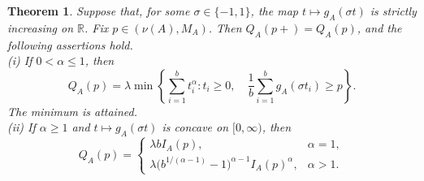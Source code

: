\documentclass[a4paper, 11pt]{article}
\newcommand{\1}{\mathbf 1}
\theoremstyle{plain}
\newtheorem{theorem}{Theorem}[section]
\begin{document}
\begin{theorem}\label{thm:dimension-reduction}
Suppose that, for some \(\sigma\in\{-1,1\}\), the map
\(t\mapsto g_A(\sigma t)\) is strictly increasing on
 \(\mathbb{R}\). Fix $p\in(\nu(A),M_A)$. Then \(Q_A(p+)=Q_A(p)\), and the following assertions hold.\\
(i) If \(0<\alpha\le1\), then
\begin{equation}\label{eq:first-generation}
  Q_A(p)
  =\lambda\min\left\{
      \sum_{i=1}^b t_i^\alpha:
      t_i\ge0,\quad
      \frac1b\sum_{i=1}^b g_A(\sigma t_i)\ge p
    \right\}.
\end{equation}
The minimum is attained.\\
(ii) If $\alpha\geq1$ and \(t\mapsto g_A(\sigma t)\) is concave on
\([0,\infty)\), then
\[
  Q_A(p)=
  \begin{cases}
    \lambda b I_A(p), & \alpha=1,\\[3pt]
    \lambda\bigl(b^{1/(\alpha-1)}-1\bigr)^{\alpha-1}I_A(p)^\alpha,
      & \alpha>1.
  \end{cases}
\]
\end{theorem}
\end{document}
